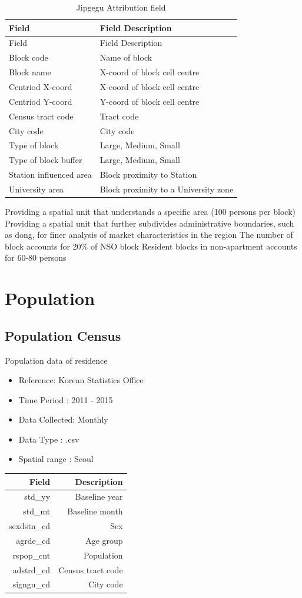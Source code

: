 \documentclass[]{book}
\providecommand{\tightlist}{%
  \setlength{\itemsep}{0pt}\setlength{\parskip}{0pt}}
\theoremstyle{definition}
\theoremstyle{definition}
\theoremstyle{definition}
\theoremstyle{remark}
\begin{document}
\begin{longtable}[]{@{}ll@{}}
\caption{\label{tab:foo} Jipgegu Attribution field}\tabularnewline
\toprule
Field & Field Description\tabularnewline
\midrule
\endfirsthead
\toprule
Field & Field Description\tabularnewline
\midrule
\endhead
Block code & Name of block\tabularnewline
Block name & X-coord of block cell centre\tabularnewline
Centriod X-coord & X-coord of block cell centre\tabularnewline
Centriod Y-coord & Y-coord of block cell centre\tabularnewline
Census tract code & Tract code\tabularnewline
City code & City code\tabularnewline
Type of block & Large, Medium, Small\tabularnewline
Type of block buffer & Large, Medium, Small\tabularnewline
Station influenced area & Block proximity to Station\tabularnewline
University area & Block proximity to a University zone\tabularnewline
\bottomrule
\end{longtable}

Providing a spatial unit that understands a specific area (100 persons
per block) Providing a spatial unit that further subdivides
administrative boundaries, such as dong, for finer analysis of market
characteristics in the region The number of block accounts for 20\% of
NSO block Resident blocks in non-apartment accounts for 60-80 persons

\chapter{Population}\label{population}

\section{Population Census}\label{population-census}

Population data of residence

\begin{itemize}
\tightlist
\item
  Reference: Korean Statistics Office
\item
  Time Period : 2011 - 2015
\item
  Data Collected: Monthly
\item
  Data Type : .csv
\item
  Spatial range : Seoul 
\end{itemize}

\begin{longtable}[]{@{}rr@{}}
\toprule
Field & Description\tabularnewline
\midrule
\endhead
std\_yy & Baseline year\tabularnewline
std\_mt & Baseline month\tabularnewline
sexdstn\_cd & Sex\tabularnewline
agrde\_cd & Age group\tabularnewline
rspop\_cnt & Population\tabularnewline
adstrd\_cd & Census tract code\tabularnewline
signgu\_cd & City code\tabularnewline
\bottomrule
\end{longtable}
\end{document}
